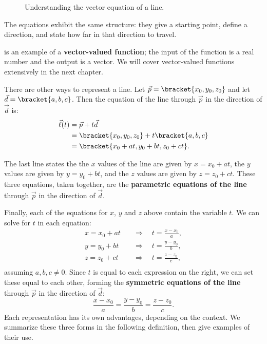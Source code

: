 \begin{figure}[!hb]
\centering
{}
\captionsetup{type=figure}%
\caption{Understanding the vector equation of a line.}
\label{fig:lines_eq}
\end{figure}

The equations exhibit the same structure: they give a starting point, define a direction, and state how far in that direction to travel.

 is an example of a \textbf{vector-valued function}; the input of the function is a real number and the output is a vector. We will cover vector-valued functions extensively in the next chapter.

There are other ways to represent a line. Let $\vec p =\bracket{x_0,y_0,z_0}$ and let $\vec d =\bracket{a,b,c}$. Then the equation of the line through $\vec p$ in the direction of $\vec d$ is:
\begin{align*}
\vec\ell(t) &= \vec p + t\vec d \\
						&=\bracket{x_0,y_0,z_0}+ t\bracket{a,b,c}\\
						&=\bracket{x_0 + at, y_0+bt, z_0+ct}.
\end{align*}

The last line states the the $x$ values of the line are given by $x=x_0+at$, the $y$ values are given by $y = y_0+bt$, and the $z$ values are given by $z = z_0 + ct$. These three equations, taken together, are the \textbf{parametric equations of the line} through $\vec p$ in the direction of $\vec d$.

Finally, each of the equations for $x$, $y$ and $z$ above contain the variable $t$. We can solve for $t$ in each equation:
\begin{align*}
x = x_0+at \quad&\Rightarrow\quad t = \frac{x-x_0}{a},\\
y = y_0+bt \quad&\Rightarrow\quad t = \frac{y-y_0}{b},\\
z = z_0+ct \quad&\Rightarrow\quad t = \frac{z-z_0}{c},\\
\end{align*}
assuming $a,b,c\neq 0$.
Since $t$ is equal to each expression on the right, we can set these equal to each other, forming the \textbf{symmetric equations of the line} through $\vec p$ in the direction of $\vec d$:
\[\frac{x-x_0}{a} = \frac{y-y_0}{b}=\frac{z-z_0}{c}.\]
Each representation has its own advantages, depending on the context. We summarize these three forms in the following definition, then give examples of their use.

